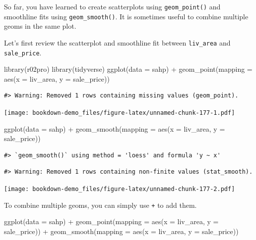 \documentclass[
]{book}
\newenvironment{Shaded}{\begin{snugshade}}{\end{snugshade}}
\newcommand{\AttributeTok}[1]{\textcolor[rgb]{0.77,0.63,0.00}{#1}}
\newcommand{\FunctionTok}[1]{\textcolor[rgb]{0.00,0.00,0.00}{#1}}
\newcommand{\NormalTok}[1]{#1}
\newcommand{\SpecialCharTok}[1]{\textcolor[rgb]{0.00,0.00,0.00}{#1}}
\begin{document}
So far, you have learned to create scatterplots using \texttt{geom\_point()} and smoothline fits using \texttt{geom\_smooth()}. It is sometimes useful to combine multiple geoms in the same plot.

Let's first review the scatterplot and smoothline fit between \texttt{liv\_area} and \texttt{sale\_price}.

\begin{Shaded}
\begin{Highlighting}[]
\FunctionTok{library}\NormalTok{(r02pro)}
\FunctionTok{library}\NormalTok{(tidyverse)}
\FunctionTok{ggplot}\NormalTok{(}\AttributeTok{data =}\NormalTok{ sahp) }\SpecialCharTok{+} \FunctionTok{geom\_point}\NormalTok{(}\AttributeTok{mapping =} \FunctionTok{aes}\NormalTok{(}\AttributeTok{x =}\NormalTok{ liv\_area, }\AttributeTok{y =}\NormalTok{ sale\_price))}
\end{Highlighting}
\end{Shaded}

\begin{verbatim}
#> Warning: Removed 1 rows containing missing values (geom_point).
\end{verbatim}

\texttt{[image: bookdown-demo\_files/figure-latex/unnamed-chunk-177-1.pdf]}

\begin{Shaded}
\begin{Highlighting}[]
\FunctionTok{ggplot}\NormalTok{(}\AttributeTok{data =}\NormalTok{ sahp) }\SpecialCharTok{+} \FunctionTok{geom\_smooth}\NormalTok{(}\AttributeTok{mapping =} \FunctionTok{aes}\NormalTok{(}\AttributeTok{x =}\NormalTok{ liv\_area, }\AttributeTok{y =}\NormalTok{ sale\_price))}
\end{Highlighting}
\end{Shaded}

\begin{verbatim}
#> `geom_smooth()` using method = 'loess' and formula 'y ~ x'
\end{verbatim}

\begin{verbatim}
#> Warning: Removed 1 rows containing non-finite values (stat_smooth).
\end{verbatim}

\texttt{[image: bookdown-demo\_files/figure-latex/unnamed-chunk-177-2.pdf]}

To combine multiple geoms, you can simply use \texttt{+} to add them.

\begin{Shaded}
\begin{Highlighting}[]
\FunctionTok{ggplot}\NormalTok{(}\AttributeTok{data =}\NormalTok{ sahp) }\SpecialCharTok{+} \FunctionTok{geom\_point}\NormalTok{(}\AttributeTok{mapping =} \FunctionTok{aes}\NormalTok{(}\AttributeTok{x =}\NormalTok{ liv\_area, }\AttributeTok{y =}\NormalTok{ sale\_price)) }\SpecialCharTok{+} \FunctionTok{geom\_smooth}\NormalTok{(}\AttributeTok{mapping =} \FunctionTok{aes}\NormalTok{(}\AttributeTok{x =}\NormalTok{ liv\_area, }\AttributeTok{y =}\NormalTok{ sale\_price))}
\end{Highlighting}
\end{Shaded}
\end{document}
